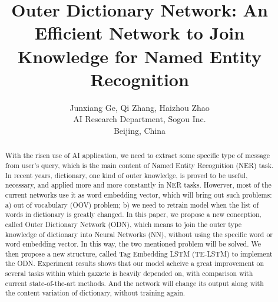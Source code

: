 \documentclass[letterpaper]{article} %
\title{ Outer Dictionary Network: An Efficient Network to Join Knowledge for Named Entity Recognition }
\author{Junxiang Ge, Qi Zhang, Haizhou Zhao\\ 
AI Research Department, Sogou Inc. \\
Beijing, China}
\begin{document}
\maketitle

\begin{abstract}
With the risen use of AI application, we need to extract some specific type of message from user's query, which is the main content of Named Entity Recognition (NER) task. In recent years, dictionary, one kind of outer knowledge, is proved to be useful, necessary, and applied more and more constantly in NER tasks. Howerver, most of the current networks use it as word embedding vector, which will bring out such problems: a) out of vocabulary (OOV) problem; b) we need to retrain model when the list of words in dictionary is greatly changed. In this paper, we propose a new conception, called Outer Dictionary Network (ODN), which means to join the outer type knowledge of dictionary into Neural Networks (NN), without using the specific word or word embedding vector. In this way, the two mentioned problem will be solved. We then propose a new structure, called Tag Embedding LSTM (TE-LSTM) to implement the ODN. Experiment results shows that our model acheive a great improvement on several tasks within which gazzete is heavily depended on, with comparison with current state-of-the-art methods. And the network will change its output along with the content variation of dictionary, without training again.
\end{abstract}
\end{document}
